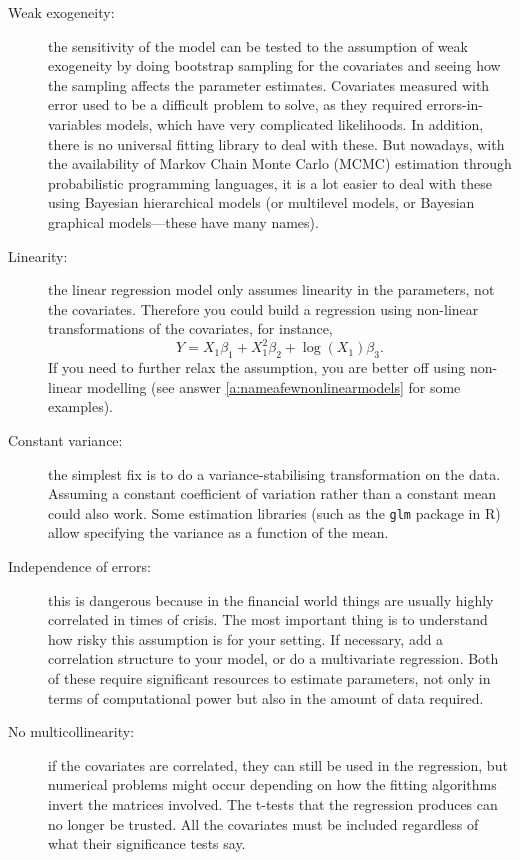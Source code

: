 \documentclass[a4paper]{article}
\begin{document}
\begin{description}
  \item[Weak exogeneity:] the sensitivity of the model can be tested to the assumption of weak exogeneity by doing bootstrap sampling for the covariates and seeing how the sampling affects the parameter estimates.
  Covariates measured with error used to be a difficult problem to solve, as they required errors-in-variables models, which have very complicated likelihoods. In addition, there is no universal fitting library to deal with these. But nowadays, with the availability of Markov Chain Monte Carlo (MCMC) estimation through probabilistic programming languages, it is a lot easier to deal with these using Bayesian hierarchical models (or multilevel models, or Bayesian graphical models---these have many names).
  \item[Linearity:] the linear regression model only assumes linearity in the parameters, not the covariates. Therefore you could build a regression using non-linear transformations of the covariates, for instance,
  \[
    Y = X_1 \beta_1 +
        X_1^2 \beta_2 +
        \log(X_1) \beta_3
    \text{.}
  \]
  If you need to further relax the assumption, you are better off using non-linear modelling (see answer \ref{a:nameafewnonlinearmodels} for some examples).
  \item[Constant variance:] the simplest fix is to do a variance-stabilising transformation on the data. Assuming a constant coefficient of variation rather than a constant mean could also work. Some estimation libraries (such as the \verb+glm+ package in R) allow specifying the variance as a function of the mean.
  \item[Independence of errors:] this is dangerous because in the financial world things are usually highly correlated in times of crisis. The most important thing is to understand how risky this assumption is for your setting. If necessary, add a correlation structure to your model, or do  a multivariate regression. Both of these require significant resources to estimate parameters, not only in terms of computational power but also in the amount of data required.
  \item[No multicollinearity:] if the covariates are correlated, they can still be used in the regression, but numerical problems might occur depending on how the fitting algorithms invert the matrices involved.
  The t-tests that the regression produces can no longer be trusted. All the covariates must be included regardless of what their significance tests say.

\end{description}
\end{document}
